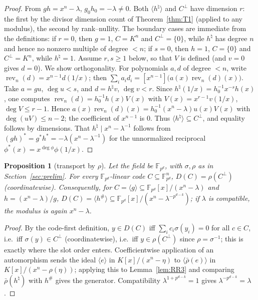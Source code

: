 \documentclass[10pt,journal,draftclsnofoot,onecolumn]{IEEEtran}
\newtheorem{proposition}[theorem]{Proposition}
\theoremstyle{definition}
\theoremstyle{remark}
\begin{document}
\begin{proof}
From \(gh = x^n - \lambda\), \(g_0 h_0 = -\lambda \ne 0\). Both
\(\langle h^{\natural} \rangle\) and \(C^\perp\) have dimension \(r\):
the first by the divisor dimension count of Theorem~\ref{thm:T1}
(applied to any modulus), the second by rank--nullity. The boundary
cases are immediate from the definitions: if \(r = 0\), then \(g = 1\),
\(C = K^n\) and \(C^\perp = \{0\}\), while \(h^{\natural}\) has degree
\(n\) and hence no nonzero multiple of degree \(< n\); if \(s = 0\), then
\(h = 1\), \(C = \{0\}\) and \(C^\perp = K^n\), while
\(h^{\natural} = 1\). Assume \(r, s \ge 1\) below, so that \(V\) is
defined (and \(v = 0\) gives \(d = 0\)). We show orthogonality. For polynomials \(a, d\) of degree \(< n\), write
\(\operatorname{rev}_n(d) = x^{n-1} d(1/x)\); then
\(\sum_i a_i d_i = [x^{n-1}]\big(a(x) \operatorname{rev}_n(d)(x)\big)\).
Take \(a = gu\), \(\deg u < s\), and \(d = h^{\natural} v\),
\(\deg v < r\). Since
\(h^{\natural}(1/x) = h_0^{-1} x^{-s} h(x)\), one computes
\(\operatorname{rev}_n(d) = h_0^{-1} h(x) V(x)\) with
\(V(x) = x^{r-1} v(1/x)\), \(\deg V \le r-1\). Hence
\(a(x)\operatorname{rev}_n(d)(x) = h_0^{-1} (x^n - \lambda) u(x) V(x)\)
with \(\deg(uV) \le n-2\); the coefficient of \(x^{n-1}\) is \(0\).
Thus \(\langle h^{\natural}\rangle \subseteq C^\perp\), and equality
follows by dimensions. That \(h^{\natural} \mid x^n - \lambda^{-1}\)
follows from \((gh)^* = g^* h^* = -\lambda(x^n - \lambda^{-1})\) for the
unnormalized reciprocal \(\phi^*(x) = x^{\deg\phi}\phi(1/x)\).
\end{proof}

\begin{proposition}[transport by \(\rho\)]\label{prop:transport}
Let the field be \(\mathbb{F}_{p^d}\), with \(\sigma, \rho\) as in
Section~\ref{sec:prelim}. For every \(\mathbb{F}_{p^d}\)-linear code
\(C \subseteq \mathbb{F}_{p^d}^n\),
\(D(C) = \rho(C^\perp)\) (coordinatewise). Consequently, for
\(C = \langle g \rangle \subseteq \mathbb{F}_{p^d}[x]/(x^n-\lambda)\) and
\(h = (x^n-\lambda)/g\),
\(D(C) = \langle h^{\#} \rangle \subseteq
\mathbb{F}_{p^d}[x]/(x^n - \lambda^{-p^{d-k}})\); if \(\lambda\) is
compatible, the modulus is again \(x^n - \lambda\).
\end{proposition}

\begin{proof}
By the code-first definition, \(y \in D(C)\) iff
\(\sum_i c_i \sigma(y_i) = 0\) for all \(c \in C\), i.e.\ iff
\(\sigma(y) \in C^\perp\) (coordinatewise), i.e.\ iff
\(y \in \rho(C^\perp)\) since \(\rho = \sigma^{-1}\); this is exactly
where the slot order enters. Coefficientwise application of an
automorphism sends the ideal \(\langle e \rangle\) in
\(K[x]/(x^n-\eta)\) to \(\langle \bar\rho(e)\rangle\) in
\(K[x]/(x^n - \rho(\eta))\); applying this to Lemma~\ref{lem:RR3} and
comparing \(\bar\rho(h^{\natural})\) with \(h^{\#}\) gives the generator.
Compatibility \(\lambda^{1+p^{d-k}}=1\) gives
\(\lambda^{-p^{d-k}} = \lambda\).
\end{proof}
\end{document}
